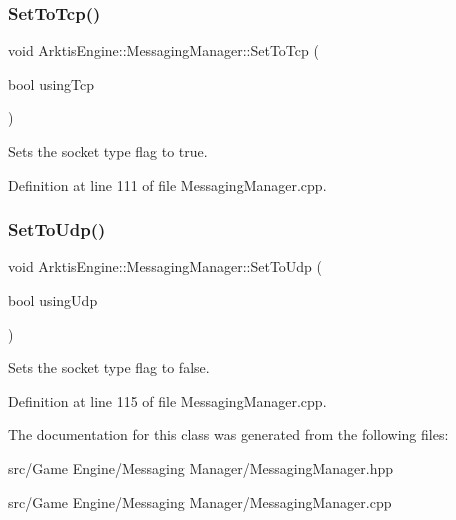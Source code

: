\subsubsection{\texorpdfstring{SetToTcp()}{SetToTcp()}}
{\footnotesize\ttfamily void Arktis\+Engine\+::\+Messaging\+Manager\+::\+Set\+To\+Tcp (\begin{DoxyParamCaption}\item[{bool}]{using\+Tcp }\end{DoxyParamCaption})}



Sets the socket type flag to true. 

\begin{DoxyVerb}\end{DoxyVerb}
 

Definition at line 111 of file Messaging\+Manager.\+cpp.


\begin{DoxyCode}{0}

\end{DoxyCode}
\mbox{\label{class_arktis_engine_1_1_messaging_manager_a13dfdd0dedb881e64364351c24c6ecb3}} 
\subsubsection{\texorpdfstring{SetToUdp()}{SetToUdp()}}
{\footnotesize\ttfamily void Arktis\+Engine\+::\+Messaging\+Manager\+::\+Set\+To\+Udp (\begin{DoxyParamCaption}\item[{bool}]{using\+Udp }\end{DoxyParamCaption})}



Sets the socket type flag to false. 

\begin{DoxyVerb}\end{DoxyVerb}
 

Definition at line 115 of file Messaging\+Manager.\+cpp.


\begin{DoxyCode}{0}

\end{DoxyCode}


The documentation for this class was generated from the following files\+:\begin{DoxyCompactItemize}
\item 
src/\+Game Engine/\+Messaging Manager/Messaging\+Manager.\+hpp\item 
src/\+Game Engine/\+Messaging Manager/Messaging\+Manager.\+cpp\end{DoxyCompactItemize}
